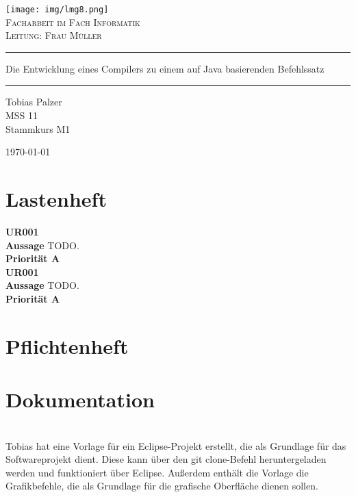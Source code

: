 \documentclass[12pt, a4paper, oneside]{article}
\newcommand{\myuline}[1]{%
  \uline{\phantom{#1}}%
  \llap{\contour{white}{#1}}%
}
\begin{document}
\begin{titlepage}
\begin{center}
\texttt{[image: img/lmg8.png]}\\[1.5cm]
\textsc{\Large Facharbeit im Fach Informatik }\\[0.4cm]
\textsc{Leitung: Frau Müller}\\[0.4cm]
\hrule
\bigskip
\huge Die Entwicklung eines Compilers zu einem auf Java basierenden Befehlssatz\\[0.5cm]
\hrule
\begin{minipage}{0.4\textwidth}
\begin{flushleft} \large
\end{flushleft}
\end{minipage}
\hfill
\begin{minipage}{0.4\textwidth}
\begin{flushright} \large
\bigskip
\medskip
Tobias Palzer \\
MSS 11 \\
Stammkurs M1  \\[0.8cm]
\end{flushright}
\end{minipage}
\vfill
{\large \today}
\end{center}
\end{titlepage}

\tableofcontents
\newpage
\listoffigures
\newpage


\section{Lastenheft}
\textbf{UR001}\\
\textbf{Aussage} TODO.\\
\textbf{Priorität A} \\
\newline
\textbf{UR001}\\
\textbf{Aussage} TODO.\\
\textbf{Priorität A} \\

\newpage
\section{Pflichtenheft}

\newpage
\section{Dokumentation}
\myuline{23.09.2019:} \\
Tobias hat eine Vorlage für ein Eclipse-Projekt erstellt, die als Grundlage für das Softwareprojekt dient.
Diese kann über den \glqq git clone\grqq{}-Befehl heruntergeladen werden und funktioniert über Eclipse.
Außerdem enthält die Vorlage die Grafikbefehle, die als Grundlage für die grafische Oberfläche dienen sollen.
\end{document}
